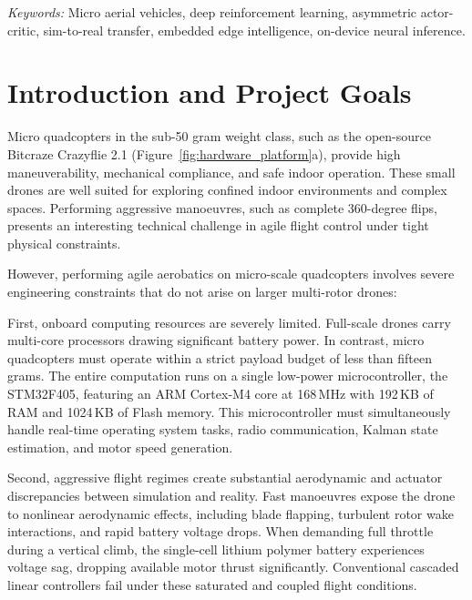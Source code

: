 \documentclass[11pt,a4paper]{article}
\begin{document}
\vspace{0.4em}
\noindent\textit{Keywords:} Micro aerial vehicles, deep reinforcement learning, asymmetric actor-critic, sim-to-real transfer, embedded edge intelligence, on-device neural inference.

\vspace{0.8em}

\section{Introduction and Project Goals}
\label{sec:introduction}

Micro quadcopters in the sub-50 gram weight class, such as the open-source Bitcraze Crazyflie 2.1 (Figure~\ref{fig:hardware_platform}a), provide high maneuverability, mechanical compliance, and safe indoor operation. These small drones are well suited for exploring confined indoor environments and complex spaces. Performing aggressive manoeuvres, such as complete 360-degree flips, presents an interesting technical challenge in agile flight control under tight physical constraints.

However, performing agile aerobatics on micro-scale quadcopters involves severe engineering constraints that do not arise on larger multi-rotor drones:

First, onboard computing resources are severely limited. Full-scale drones carry multi-core processors drawing significant battery power. In contrast, micro quadcopters must operate within a strict payload budget of less than fifteen grams. The entire computation runs on a single low-power microcontroller, the STM32F405, featuring an ARM Cortex-M4 core at 168\,MHz with 192\,KB of RAM and 1024\,KB of Flash memory. This microcontroller must simultaneously handle real-time operating system tasks, radio communication, Kalman state estimation, and motor speed generation.

Second, aggressive flight regimes create substantial aerodynamic and actuator discrepancies between simulation and reality. Fast manoeuvres expose the drone to nonlinear aerodynamic effects, including blade flapping, turbulent rotor wake interactions, and rapid battery voltage drops. When demanding full throttle during a vertical climb, the single-cell lithium polymer battery experiences voltage sag, dropping available motor thrust significantly. Conventional cascaded linear controllers fail under these saturated and coupled flight conditions.
\end{document}
